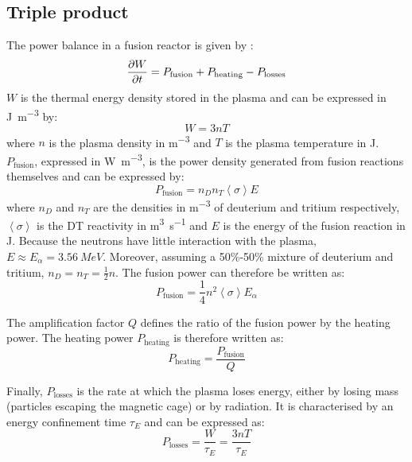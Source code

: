 \subsection{Triple product}
The power balance in a fusion reactor is given by \cite{mccracken_fusion_2013}:
\begin{equation}
    \frac{\partial W}{\partial t} = P_\mathrm{fusion} + P_\mathrm{heating} - P_\mathrm{losses}
    \labeq{plasma energy balance}
\end{equation}
$W$ is the thermal energy density stored in the \gls{plasma} and can be expressed in \si{J.m^{-3}} by:
\begin{equation}
    W = 3 n T
\end{equation}
where $n$ is the \gls{plasma} density in \si{m^{-3}} and $T$ is the \gls{plasma} temperature in \si{J}.
$P_\mathrm{fusion}$, expressed in \si{W.m^{-3}}, is the power density generated from fusion reactions themselves and can be expressed by:
\begin{equation}
    P_\mathrm{fusion} = n_D n_T \left\langle \sigma \right\rangle E
\end{equation}
where $n_D$ and $n_T$ are the densities in \si{m^{-3}} of deuterium and tritium respectively, $\left\langle \sigma \right\rangle$ is the DT reactivity in \si{m^3.s^{-1}} and $E$ is the energy of the fusion reaction in \si{J}.
Because the neutrons have little interaction with the \gls{plasma}, $E \approx E_\alpha = \SI{3.56}{MeV}$.
Moreover, assuming a 50\%-50\% mixture of deuterium and tritium, $n_D = n_T = \frac{1}{2} n$.
The fusion power can therefore be written as:
\begin{equation}
    P_\mathrm{fusion} = \frac{1}{4} n^2 \left\langle \sigma \right\rangle E_\alpha
\end{equation}

The amplification factor $Q$ defines the ratio of the fusion power by the heating power.
The heating power $P_\mathrm{heating}$ is therefore written as:
\begin{equation}
    P_\mathrm{heating} = \frac{P_\mathrm{fusion}}{Q}
\end{equation}

Finally, $P_\mathrm{losses}$ is the rate at which the \gls{plasma} loses energy, either by losing mass (particles escaping the magnetic cage) or by radiation.
It is characterised by an energy confinement time $\tau_E$ and can be expressed as:
\begin{equation}
    P_\mathrm{losses} = \frac{W}{\tau_E} = \frac{3 n T}{\tau_E}
\end{equation}

